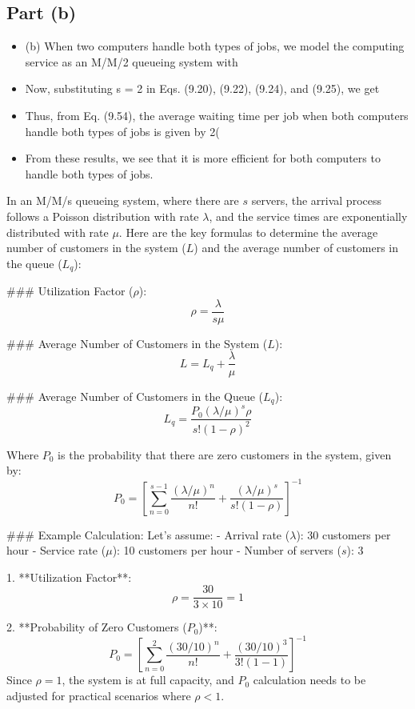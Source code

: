 \documentclass[a4paper12pt]{article}
\begin{document}
\subsection*{Part (b)}
\begin{itemize}
    \item (b) When two computers handle both types of jobs, we model the computing service as an M/M/2 
queueing system with 
\item Now, substituting s = 2 in Eqs. (9.20), (9.22), (9.24), and (9.25), we get 
\item Thus, from Eq. (9.54), the average waiting time per job when both computers handle both types of jobs 
is given by 
2(%
\item From these results, we see that it is more efficient for both computers to handle both types of jobs.
\end{itemize}


In an M/M/s queueing system, where there are \(s\) servers, the arrival process follows a Poisson distribution with rate \(\lambda\), and the service times are exponentially distributed with rate \(\mu\). Here are the key formulas to determine the average number of customers in the system (\(L\)) and the average number of customers in the queue (\(L_q\)):

### Utilization Factor (\(\rho\)):
$$\rho = \frac{\lambda}{s \mu}$$

### Average Number of Customers in the System (\(L\)):
$$L = L_q + \frac{\lambda}{\mu}$$

### Average Number of Customers in the Queue (\(L_q\)):
$$L_q = \frac{P_0 (\lambda/\mu)^s \rho}{s! (1 - \rho)^2}$$

Where \(P_0\) is the probability that there are zero customers in the system, given by:
$$P_0 = \left[ \sum_{n=0}^{s-1} \frac{(\lambda/\mu)^n}{n!} + \frac{(\lambda/\mu)^s}{s! (1 - \rho)} \right]^{-1}$$

### Example Calculation:
Let's assume:
- Arrival rate (\(\lambda\)): 30 customers per hour
- Service rate (\(\mu\)): 10 customers per hour
- Number of servers (\(s\)): 3

1. **Utilization Factor**:
   $$\rho = \frac{30}{3 \times 10} = 1$$

2. **Probability of Zero Customers (\(P_0\))**:
   $$P_0 = \left[ \sum_{n=0}^{2} \frac{(30/10)^n}{n!} + \frac{(30/10)^3}{3! (1 - 1)} \right]^{-1}$$
   Since \(\rho = 1\), the system is at full capacity, and \(P_0\) calculation needs to be adjusted for practical scenarios where \(\rho < 1\).
\end{document}
